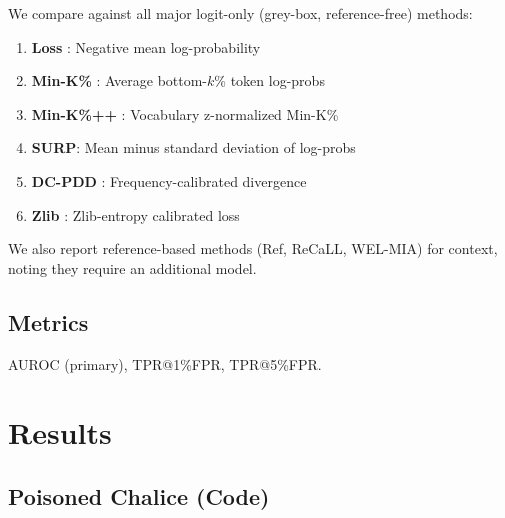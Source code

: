 \documentclass[11pt]{article}
\begin{document}
We compare against all major logit-only (grey-box, reference-free) methods:
\begin{enumerate}
    \item \textbf{Loss} \citep{yeom2018privacy}: Negative mean log-probability
    \item \textbf{Min-K\%} \citep{shi2024detecting}: Average bottom-$k$\% token log-probs
    \item \textbf{Min-K\%++} \citep{zhang2024minkpp}: Vocabulary z-normalized Min-K\%
    \item \textbf{SURP}: Mean minus standard deviation of log-probs
    \item \textbf{DC-PDD} \citep{zhang2024dcpdd}: Frequency-calibrated divergence
    \item \textbf{Zlib} \citep{carlini2021extracting}: Zlib-entropy calibrated loss
\end{enumerate}

We also report reference-based methods (Ref, ReCaLL, WEL-MIA) for context, noting they require an additional model.

\subsection{Metrics}

AUROC (primary), TPR@1\%FPR, TPR@5\%FPR.

\section{Results}
\label{sec:results}

\subsection{Poisoned Chalice (Code)}
\end{document}
